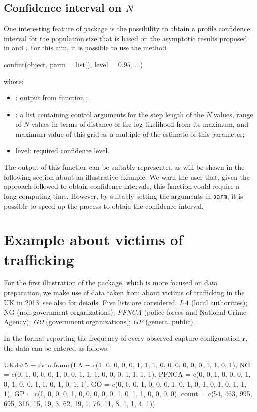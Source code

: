 \subsection{Confidence interval on $N$}
%
One interesting feature of package  is the possibility to obtain a profile confidence interval for the population size that is based on the asymptotic results proposed in \cite{Liu2017} and \cite{bartolucci2024estimating}.
For this aim, it is possible to use the method
%
\begin{example*}
confint(object, parm = list(), level = 0.95, ...)
\end{example*}
%
where:
%
\begin{itemize}
%
\item {}: output from function ;
%
\item {}: a list containing control arguments for the step length of the $N$ values, range of $N$ values in terms of distance of the log-likelihood from its maximum, and maximum value of this grid as a multiple of the estimate of this parameter;
%
\item{level}: required confidence level.
%
\end{itemize}
%
The output of this function can be suitably represented as will be shown in the following section about an illustrative example.
We warn the user that, given the approach followed to obtain confidence intervals, this function could require a long computing time.
However, by suitably setting the arguments in {\tt parm}, it is possible to speed up the process to obtain the confidence interval.
%
\section{Example about victims of trafficking}
%
For the first illustration of the package, which is more focused on data preparation, we make use of data taken from \cite{silverman2020multiple} about victims of trafficking in the UK in 2013; see also \cite{silverman2014} for details.
Five lists are considered: {\em LA} (local authorities); NG (non-government organizations); {\em PFNCA} (police forces and National Crime Agency); {\em GO} (government organizations); {\em GP} (general public).

In the format reporting the frequency of every observed capture configuration $\bm{r}$, the data can be entered as follows:

\begin{example*}
UKdat5 = data.frame(LA = c(1, 0, 0, 0, 0, 1, 1, 1, 0, 0, 0, 0, 0, 0, 1, 1, 0, 1),
                    NG = c(0, 1, 0, 0, 0, 1, 0, 0, 1, 1, 1, 0, 0, 0, 1, 1, 1, 1),
                    PFNCA = c(0, 0, 1, 0, 0, 0, 1, 0, 1, 0, 0, 1, 1, 0, 1, 0, 1, 1),
                    GO = c(0, 0, 0, 1, 0, 0, 0, 1, 0, 1, 0, 1, 0, 1, 0, 1, 1, 1),
                    GP = c(0, 0, 0, 0, 1, 0, 0, 0, 0, 0, 1, 0, 1, 1, 0, 0, 0, 0),
                    count = c(54, 463, 995, 695, 316, 15, 19, 3, 62, 19,
                              1, 76, 11, 8, 1, 1, 4, 1))
\end{example*}

